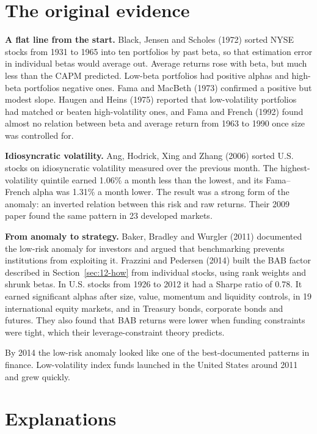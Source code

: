 \section{The original evidence}
\label{sec:12-evidence}

\textbf{A flat line from the start.} Black, Jensen and Scholes (1972) sorted NYSE stocks from 1931 to 1965 into ten portfolios by past beta, so that estimation error in individual betas would average out. Average returns rose with beta, but much less than the CAPM predicted. Low-beta portfolios had positive alphas and high-beta portfolios negative ones. Fama and MacBeth (1973) confirmed a positive but modest slope. Haugen and Heins (1975) reported that low-volatility portfolios had matched or beaten high-volatility ones, and Fama and French (1992) found almost no relation between beta and average return from 1963 to 1990 once size was controlled for.

\textbf{Idiosyncratic volatility.} Ang, Hodrick, Xing and Zhang (2006) sorted U.S. stocks on idiosyncratic volatility measured over the previous month. The highest-volatility quintile earned 1.06\% a month less than the lowest, and its Fama--French alpha was 1.31\% a month lower. The result was a strong form of the anomaly: an inverted relation between this risk and raw returns. Their 2009 paper found the same pattern in 23 developed markets.

\textbf{From anomaly to strategy.} Baker, Bradley and Wurgler (2011) documented the low-risk anomaly for investors and argued that benchmarking prevents institutions from exploiting it. Frazzini and Pedersen (2014) built the BAB factor described in Section~\ref{sec:12-how} from individual stocks, using rank weights and shrunk betas. In U.S. stocks from 1926 to 2012 it had a Sharpe ratio of 0.78. It earned significant alphas after size, value, momentum and liquidity controls, in 19 international equity markets, and in Treasury bonds, corporate bonds and futures. They also found that BAB returns were lower when funding constraints were tight, which their leverage-constraint theory predicts.

By 2014 the low-risk anomaly looked like one of the best-documented patterns in finance. Low-volatility index funds launched in the United States around 2011 and grew quickly.

\section{Explanations}
\label{sec:12-explanations}

